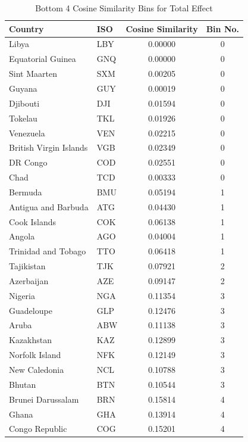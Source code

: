 \begin{table}[htbp]
\centering
\caption{Bottom 4 Cosine Similarity Bins for Total Effect}
\label{tab:bottom_cosine_similarity_bins_total_sim}
\begin{tabular}{llcc}
\toprule
Country & ISO & Cosine Similarity & Bin No. \\
\midrule
Libya & LBY &  0.00000 & 0 \\
Equatorial Guinea & GNQ &  0.00000 & 0 \\
Sint Maarten & SXM &  0.00205 & 0 \\
Guyana & GUY &  0.00019 & 0 \\
Djibouti & DJI &  0.01594 & 0 \\
Tokelau & TKL &  0.01926 & 0 \\
Venezuela & VEN &  0.02215 & 0 \\
British Virgin Islands & VGB &  0.02349 & 0 \\
DR Congo & COD &  0.02551 & 0 \\
Chad & TCD &  0.00333 & 0 \\
Bermuda & BMU &  0.05194 & 1 \\
Antigua and Barbuda & ATG &  0.04430 & 1 \\
Cook Islands & COK &  0.06138 & 1 \\
Angola & AGO &  0.04004 & 1 \\
Trinidad and Tobago & TTO &  0.06418 & 1 \\
Tajikistan & TJK &  0.07921 & 2 \\
Azerbaijan & AZE &  0.09147 & 2 \\
Nigeria & NGA &  0.11354 & 3 \\
Guadeloupe & GLP &  0.12476 & 3 \\
Aruba & ABW &  0.11138 & 3 \\
Kazakhstan & KAZ &  0.12899 & 3 \\
Norfolk Island & NFK &  0.12149 & 3 \\
New Caledonia & NCL &  0.10788 & 3 \\
Bhutan & BTN &  0.10544 & 3 \\
Brunei Darussalam & BRN &  0.15814 & 4 \\
Ghana & GHA &  0.13914 & 4 \\
Congo Republic & COG &  0.15201 & 4 \\
\bottomrule
\end{tabular}
\end{table}
